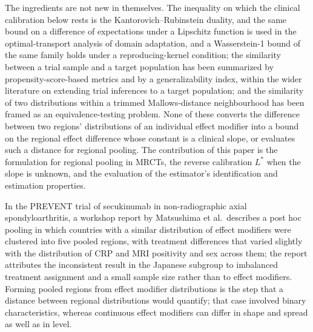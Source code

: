 \documentclass[AMA,Times1COL]{WileyNJDv5}
\begin{document}
The ingredients are not new in themselves. The inequality on which the clinical calibration below rests is the Kantorovich--Rubinstein duality, and the same bound on a difference of expectations under a Lipschitz function is used in the optimal-transport analysis of domain adaptation,\cite{shen2018} and a Wasserstein-1 bound of the same family holds under a reproducing-kernel condition;\cite{redko2017} the similarity between a trial sample and a target population has been summarized by propensity-score-based metrics\cite{stuart2011} and by a generalizability index,\cite{tipton2014} within the wider literature on extending trial inferences to a target population;\cite{dahabreh2020} and the similarity of two distributions within a trimmed Mallows-distance neighbourhood has been framed as an equivalence-testing problem.\cite{munk1998} None of these converts the difference between two regions' distributions of an individual effect modifier into a bound on the regional effect difference whose constant is a clinical slope, or evaluates such a distance for regional pooling. The contribution of this paper is the formulation for regional pooling in MRCTs, the reverse calibration $L^*$ when the slope is unknown, and the evaluation of the estimator's identification and estimation properties.

In the PREVENT trial of secukinumab in non-radiographic axial spondyloarthritis, a workshop report by Matsushima et al.\ describes a post hoc pooling in which countries with a similar distribution of effect modifiers were clustered into five pooled regions, with treatment differences that varied slightly with the distribution of CRP and MRI positivity and sex across them; the report attributes the inconsistent result in the Japanese subgroup to imbalanced treatment assignment and a small sample size rather than to effect modifiers.\cite{matsushima2024} Forming pooled regions from effect modifier distributions is the step that a distance between regional distributions would quantify; that case involved binary characteristics, whereas continuous effect modifiers can differ in shape and spread as well as in level.
\end{document}
